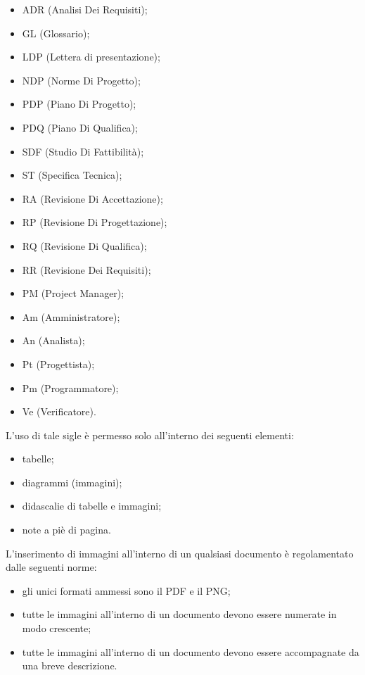 					\begin{itemize}
						\item ADR (Analisi Dei Requisiti);
						\item GL (Glossario);
						\item LDP (Lettera di presentazione);
						\item NDP (Norme Di Progetto);
						\item PDP (Piano Di Progetto);
						\item PDQ (Piano Di Qualifica);
						\item SDF (Studio Di Fattibilità);
						\item ST (Specifica Tecnica);
						\item RA (Revisione Di Accettazione);
						\item RP (Revisione Di Progettazione);
						\item RQ (Revisione Di Qualifica);
						\item RR (Revisione Dei Requisiti);
						\item PM (Project Manager);
						\item Am (Amministratore);
						\item An (Analista);
						\item Pt (Progettista);
						\item Pm (Programmatore);
						\item Ve (Verificatore).
					\end{itemize}
					L’uso di tale sigle è permesso solo all’interno dei seguenti elementi:
					\begin{itemize}
						\item tabelle;
						\item diagrammi (immagini);
						\item didascalie di tabelle e immagini;
						\item note a piè di pagina.
					\end{itemize}
				L’inserimento di immagini all’interno di un qualsiasi documento è regolamentato dalle seguenti norme:
				\begin{itemize}
					\item gli unici formati ammessi sono il PDF e il PNG;
					\item tutte le immagini all’interno di un documento devono essere numerate in modo crescente;
					\item tutte le immagini all’interno di un documento devono essere accompagnate da una breve descrizione.
				\end{itemize}
